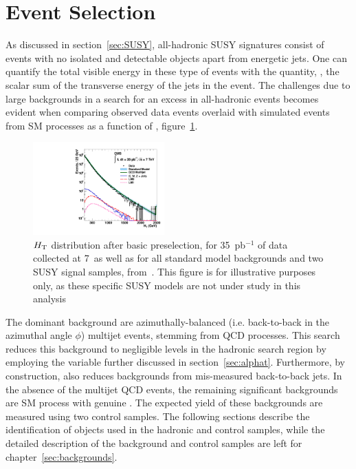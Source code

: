 \clearpage
\section{Event Selection\label{sec:eventSelection}}

As discussed in section~\ref{sec:SUSY}, all-hadronic SUSY signatures consist of events with
no isolated and detectable objects apart from energetic jets. One can quantify the
total visible energy in these type of events with the quantity, \scalht, the scalar sum of 
the transverse energy of the jets in the event. The challenges due to large
backgrounds in a search for an excess in all-hadronic events becomes evident 
when comparing observed data events overlaid with simulated events from 
SM processes as a function of \scalht, figure~\ref{fig:HT-distribution}.

\begin{figure}[h!t]
  \begin{center}
      \includegraphics[width=0.45\textwidth,]{figures/data-mc/AllcombinedHT_all.pdf}
      \caption{\label{fig:ht} $\mbox{$H_\text{T}$}$ distribution after basic preselection,
           for 35~pb$^{-1}$ of data collected at {7}~\tev as well as for all 
           standard model backgrounds and two SUSY signal samples, from~\cite{RA1Paper}. 
           This figure is for illustrative purposes only, as these specific SUSY 
           models are not under study in this analysis}
    \label{fig:HT-distribution}
  \end{center}
\end{figure}

The dominant background are azimuthally-balanced (i.e. back-to-back in the azimuthal angle 
$\phi$) multijet events, stemming from QCD processes. This search reduces this background 
to negligible levels in the hadronic search region by employing the \alphat variable further 
discussed in section~\ref{sec:alphat}. Furthermore, by construction, \alphat also reduces 
backgrounds from mis-measured back-to-back jets. In the absence of the multijet QCD events,
the remaining significant backgrounds are SM process with genuine \met. The expected 
yield of these backgrounds are measured using two control samples. The following sections
describe the identification of objects used in the hadronic and control samples, while the 
detailed description of the background and control samples are left for 
chapter~\ref{sec:backgrounds}.

